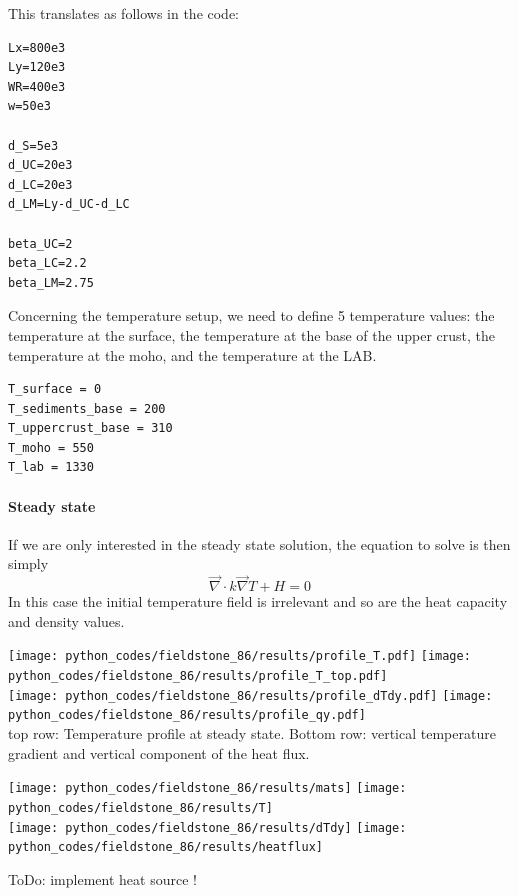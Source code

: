 This translates as follows in the code:
\begin{lstlisting}
Lx=800e3
Ly=120e3
WR=400e3
w=50e3

d_S=5e3
d_UC=20e3
d_LC=20e3
d_LM=Ly-d_UC-d_LC

beta_UC=2
beta_LC=2.2
beta_LM=2.75
\end{lstlisting}

Concerning the temperature setup, we need to define 5 temperature values:
the temperature at the surface, the temperature at the base of the upper crust,
the temperature at the moho, and the temperature at the LAB.
\begin{lstlisting}
T_surface = 0
T_sediments_base = 200
T_uppercrust_base = 310
T_moho = 550
T_lab = 1330
\end{lstlisting}

\paragraph{Steady state} 
If we are only interested in the steady state solution, the equation to solve is then 
simply 
\[
\vec\nabla \cdot k \vec\nabla T + H = 0 
\]
In this case the initial temperature field is irrelevant and so are the heat capacity 
and density values. 
\begin{center}
\texttt{[image: python\_codes/fieldstone\_86/results/profile\_T.pdf]}
\texttt{[image: python\_codes/fieldstone\_86/results/profile\_T\_top.pdf]}\\
\texttt{[image: python\_codes/fieldstone\_86/results/profile\_dTdy.pdf]}
\texttt{[image: python\_codes/fieldstone\_86/results/profile\_qy.pdf]}\\
{\captionfont top row: Temperature profile at steady state. Bottom row:
vertical temperature gradient and vertical component of the heat flux.} 
\end{center}


\begin{center}
\texttt{[image: python\_codes/fieldstone\_86/results/mats]}
\texttt{[image: python\_codes/fieldstone\_86/results/T]}\\
\texttt{[image: python\_codes/fieldstone\_86/results/dTdy]}
\texttt{[image: python\_codes/fieldstone\_86/results/heatflux]}
\end{center}


ToDo: implement heat source !
